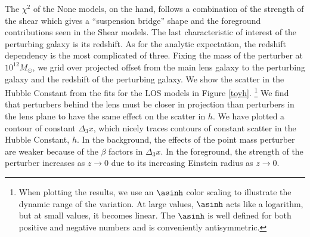 The $\chi^2$ of the None models, on the hand, follows a combination of the strength of the shear which gives a ``suspension bridge'' shape \citep{Momcheva06} and the foreground contributions seen in the Shear models. The last characteristic of interest of the perturbing galaxy is its redshift. As for the analytic expectation, the redshift dependency is the most complicated of three. Fixing the mass of the perturber at $10^{12} M_\odot$, we grid over projected offset from the main lens galaxy to the perturbing galaxy and the redshift of the perturbing galaxy. We show the scatter in the Hubble Constant from the fits for the LOS models in Figure \ref{toyh}. \footnote{When plotting the results, we use an $\asinh$ color scaling to illustrate the dynamic range of the variation. At large values, $\asinh$ acts like a logarithm, but at small values, it becomes linear. The $\asinh$ is well defined for both positive and negative numbers and is conveniently antisymmetric.} We find that perturbers behind the lens must be closer in projection than perturbers in the lens plane to have the same effect on the scatter in $h$. We have plotted a contour of constant $\Delta_3 x$, which nicely traces contours of constant scatter in the Hubble Constant, $h$. In the background, the effects of the point mass perturber are weaker because of the $\beta$ factors in $\Delta_3 x$. In the foreground, the strength of the perturber increases as $z \rightarrow 0$ due to its increasing Einstein radius as $z \rightarrow 0$.